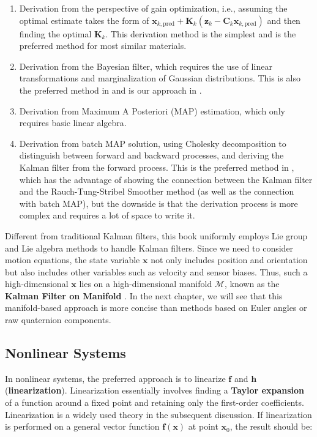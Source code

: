 \begin{enumerate}
	\item Derivation from the perspective of gain optimization, i.e., assuming the optimal estimate takes the form of $\mathbf{x}_{k, \mathrm{pred}} +\mathbf{K}_k (\mathbf{z}_k - \mathbf{C}_k \mathbf{x}_{k, \mathrm{pred}})$ and then finding the optimal $\mathbf{K}_k$. This derivation method is the simplest and is the preferred method for most similar materials.
	\item Derivation from the Bayesian filter, which requires the use of linear transformations and marginalization of Gaussian distributions. This is also the preferred method in \cite{Thrun2005} and is our approach in \cite{Gao2017}.
	\item Derivation from Maximum A Posteriori (MAP) estimation, which only requires basic linear algebra.
	\item Derivation from batch MAP solution, using Cholesky decomposition to distinguish between forward and backward processes, and deriving the Kalman filter from the forward process. This is the preferred method in \cite{Barfoot2016}, which has the advantage of showing the connection between the Kalman filter and the Rauch-Tung-Stribel Smoother method (as well as the connection with batch MAP), but the downside is that the derivation process is more complex and requires a lot of space to write it.
\end{enumerate}

Different from traditional Kalman filters, this book uniformly employs Lie group and Lie algebra methods to handle Kalman filters. Since we need to consider motion equations, the state variable $\mathbf{x}$ not only includes position and orientation but also includes other variables such as velocity and sensor biases. Thus, such a high-dimensional $\mathbf{x}$ lies on a high-dimensional manifold $\mathcal{M}$, known as the \textbf{Kalman Filter on Manifold} \cite{he2021kalman}. In the next chapter, we will see that this manifold-based approach is more concise than methods based on Euler angles or raw quaternion components.

\subsection{Nonlinear Systems}
In nonlinear systems, the preferred approach is to linearize $\mathbf{f}$ and $\mathbf{h}$ (\textbf{linearization}). Linearization essentially involves finding a \textbf{Taylor expansion} of a function around a fixed point and retaining only the first-order coefficients. Linearization is a widely used theory in the subsequent discussion. If linearization is performed on a general vector function $\mathbf{f}(\mathbf{x})$ at point $\mathbf{x}_0$, the result should be:

